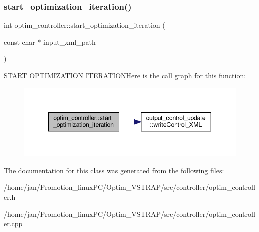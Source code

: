 \subsubsection{\texorpdfstring{start\+\_\+optimization\+\_\+iteration()}{start\_optimization\_iteration()}}
{\footnotesize\ttfamily int optim\+\_\+controller\+::start\+\_\+optimization\+\_\+iteration (\begin{DoxyParamCaption}\item[{const char $\ast$}]{input\+\_\+xml\+\_\+path }\end{DoxyParamCaption})\hspace{0.3cm}{\ttfamily [static]}}

S\+T\+A\+RT O\+P\+T\+I\+M\+I\+Z\+A\+T\+I\+ON I\+T\+E\+R\+A\+T\+I\+ONHere is the call graph for this function\+:\nopagebreak
\begin{figure}[H]
\begin{center}
\leavevmode
\includegraphics[width=343pt]{classoptim__controller_abbf7841344a99ccd29fc38891763b43f_cgraph}
\end{center}
\end{figure}


The documentation for this class was generated from the following files\+:\begin{DoxyCompactItemize}
\item 
/home/jan/\+Promotion\+\_\+linux\+P\+C/\+Optim\+\_\+\+V\+S\+T\+R\+A\+P/src/controller/optim\+\_\+controller.\+h\item 
/home/jan/\+Promotion\+\_\+linux\+P\+C/\+Optim\+\_\+\+V\+S\+T\+R\+A\+P/src/controller/optim\+\_\+controller.\+cpp\end{DoxyCompactItemize}
